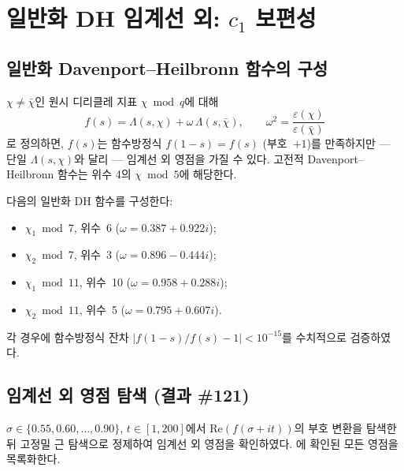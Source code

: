 \documentclass[11pt, a4paper]{article}
\theoremstyle{plain}
\theoremstyle{definition}
\newcommand{\abs}[1]{\left|#1\right|}
\newcommand{\Lam}{\Lambda}             %
\begin{document}
\section{일반화 DH 임계선 외: $c_{1}$ 보편성}
\label{sec:dh-universal}

\subsection{일반화 Davenport--Heilbronn 함수의 구성}
\label{sec:dh-construction}

$\chi \neq \bar{\chi}$인 원시 디리클레 지표 $\chi \bmod q$에 대해
\begin{equation}\label{eq:dh-general}
  f(s) = \Lam(s,\chi) + \omega\,\Lam(s,\bar{\chi}),
  \qquad \omega^{2} = \frac{\varepsilon(\chi)}{\varepsilon(\bar{\chi})}
\end{equation}
로 정의하면, $f(s)$는 함수방정식 $f(1-s) = f(s)$ (부호~$+1$)를 만족하지만
--- 단일 $\Lam(s,\chi)$와 달리 --- 임계선 외 영점을 가질 수 있다.
고전적 Davenport--Heilbronn 함수는 위수 4의 $\chi \bmod 5$에 해당한다.

다음의 일반화 DH 함수를 구성한다:
\begin{itemize}
  \item $\chi_{1} \bmod 7$, 위수~6 ($\omega = 0.387 + 0.922i$);
  \item $\chi_{2} \bmod 7$, 위수~3 ($\omega = 0.896 - 0.444i$);
  \item $\chi_{1} \bmod 11$, 위수~10 ($\omega = 0.958 + 0.288i$);
  \item $\chi_{2} \bmod 11$, 위수~5 ($\omega = 0.795 + 0.607i$).
\end{itemize}
각 경우에 함수방정식 잔차 $\abs{f(1-s)/f(s) - 1} < 10^{-15}$를 수치적으로 검증하였다.


\subsection{임계선 외 영점 탐색 (결과 \#121)}
\label{sec:dh-zeros}

$\sigma \in \{0.55, 0.60, \ldots, 0.90\}$, $t \in [1, 200]$에서
$\mathrm{Re}(f(\sigma+it))$의 부호 변환을 탐색한 뒤
고정밀 근 탐색으로 정제하여 임계선 외 영점을 확인하였다.
에 확인된 모든 영점을 목록화한다.
\end{document}
